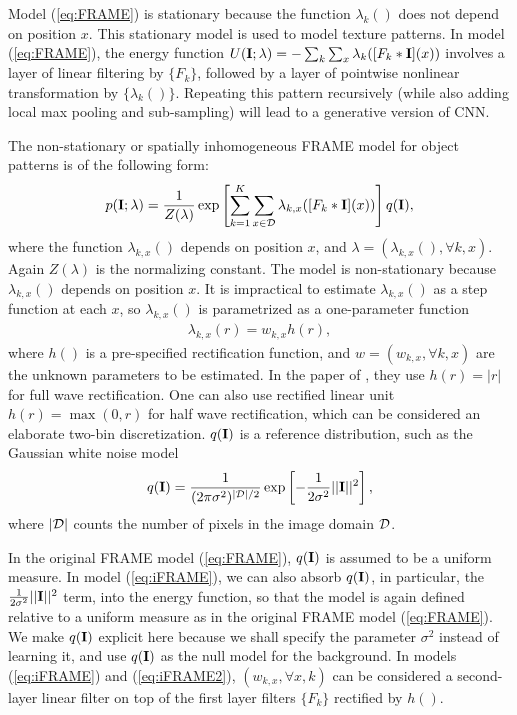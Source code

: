 \documentclass[letterpaper]{article}
\def\I{{\bf I}}
\begin{document}
Model (\ref{eq:FRAME})  is stationary because the function $\lambda_k()$ does not depend on position $x$. This stationary model is used to model texture patterns. In model (\ref{eq:FRAME}),  the energy function $U(\I; \lambda) = - \sum_{k} \sum_{x} \lambda_{k}( [F_k*\I](x))$ involves a layer of linear filtering by $\{F_k\}$, followed by a layer of pointwise nonlinear transformation by $\{\lambda_k()\}$. Repeating this pattern recursively (while also adding local max pooling and sub-sampling) will lead to a generative version of CNN. 

The  non-stationary or spatially inhomogeneous FRAME model for object patterns  \citep{xie2014learning} is  of the following form: 
\begin{eqnarray}
   p(\I; \lambda) = \frac{1}{Z(\lambda)} \exp \left[\sum_{k = 1}^{K} \sum_{x \in {\cal D}} \lambda_{k, x} ([F_k*\I](x))\right] q(\I) ,
   \label{eq:iFRAME}
\end{eqnarray}
where the function $\lambda_{k, x}()$ depends on position $x$, and $\lambda = (\lambda_{k, x}(), \forall k, x)$.  Again $Z(\lambda)$ is the normalizing constant.  The model is non-stationary because $\lambda_{k, x}()$ depends on position $x$. It is impractical to estimate $\lambda_{k, x}()$ as a step function at each $x$, so $\lambda_{k, x}()$ is parametrized as a one-parameter function 
\begin{eqnarray}
\lambda_{k, x}(r) = w_{k, x} h(r), 
\label{eq:iFRAME2}
\end{eqnarray}
 where $h()$ is a pre-specified rectification function, and $w = (w_{k, x}, \forall k, x)$ are the unknown parameters to be estimated. In the paper of \cite{xie2014learning} , they use $h(r) = |r|$ for full wave rectification. One can also use rectified linear unit $h(r) = \max(0, r)$   \citep{krizhevsky2012imagenet} for half wave rectification, which can be considered an elaborate two-bin discretization. $q(\I)$ is a reference distribution, such as the Gaussian white noise model
 \begin{eqnarray}
    q(\I) = \frac{1}{(2\pi\sigma^2)^{|{\cal D}|/2}} \exp\left[- \frac{1}{2\sigma^2} ||\I||^2\right], 
    \label{eq:Gaussian}
\end{eqnarray}   
where $|{\cal D}|$ counts the number of pixels in the image domain ${\cal D}$. 

 In the original FRAME model (\ref{eq:FRAME}), $q(\I)$ is assumed to be a uniform measure.  In model (\ref{eq:iFRAME}), we can also absorb $q(\I)$, in particular, the $ \frac{1}{2\sigma^2} ||\I||^2$ term,  into the energy function, so that the model is again defined relative to a uniform measure as in the original FRAME model (\ref{eq:FRAME}). We make $q(\I)$ explicit here because we shall specify the parameter $\sigma^2$  instead of learning it, and use $q(\I)$ as the null model for the background.  In models (\ref{eq:iFRAME}) and (\ref{eq:iFRAME2}), $(w_{k, x}, \forall x, k)$ can be considered a second-layer linear filter on top of the first layer filters $\{F_k\}$ rectified by $h()$. 
 
\end{document}
